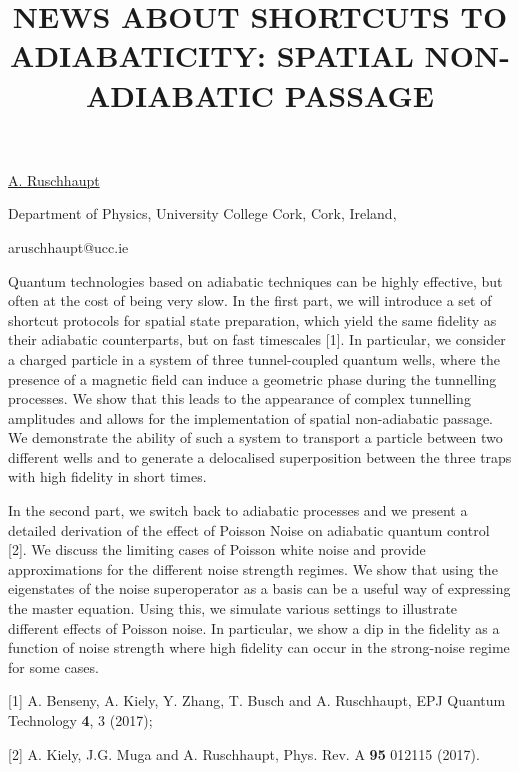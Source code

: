 \title{NEWS ABOUT SHORTCUTS TO ADIABATICITY: SPATIAL NON-ADIABATIC PASSAGE}

\underline{A. Ruschhaupt} 

{\normalsize{\vspace{-4mm}
Department of Physics,
University College Cork,
Cork,
Ireland,

\email aruschhaupt@ucc.ie}}

Quantum technologies based on adiabatic techniques can be highly effective, but often at the cost of being very slow. In the first part, we will introduce a set of shortcut protocols for spatial state preparation, which yield the same fidelity as their adiabatic counterparts, but on fast timescales [1]. In particular, we consider a charged particle in a system of three tunnel-coupled quantum wells, where the presence of a magnetic field can induce a geometric phase during the tunnelling processes. We show that this leads to the appearance of complex tunnelling amplitudes and allows for the implementation of spatial non-adiabatic passage. We demonstrate the ability of such a system to transport a particle between two different wells and to generate a delocalised superposition between the three traps with high fidelity in short times.

In the second part, we switch back to adiabatic processes and we present a detailed derivation of the effect of Poisson Noise on adiabatic quantum control [2]. We discuss the limiting cases of Poisson white noise and provide approximations for the different noise strength regimes. We show that using the eigenstates of the noise superoperator as a basis can be a useful way of expressing the master equation. Using this, we simulate various settings to illustrate different effects of Poisson noise. In particular, we show a dip in the fidelity as a function of noise strength where high fidelity can occur in the strong-noise regime for some cases.

{\normalsize
[1] A. Benseny, A. Kiely, Y. Zhang, T. Busch and A. Ruschhaupt, EPJ Quantum Technology \textbf{4}, 3 (2017);
\vsp

[2] A. Kiely, J.G. Muga and A. Ruschhaupt, Phys. Rev. A \textbf{95} 012115 (2017).
}

\vspace{\baselineskip} 